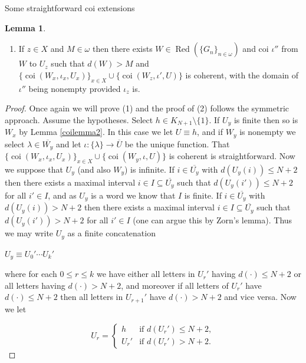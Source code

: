 \documentclass{amsart}
\theoremstyle{definition}\newtheorem{theorem}{Theorem}
\theoremstyle{definition}\newtheorem*{A}{Main Theorem}
\theoremstyle{definition}\newtheorem*{B}{Theorem \ref{elementaryequiv}}
\theoremstyle{definition}\newtheorem*{C}{Theorem \ref{continuous}}
\theoremstyle{definition}\newtheorem*{D}{Theorem \ref{bigisomorphism2}}
\theoremstyle{definition}\newtheorem{bigtheorem}{Main Theorem}
\numberwithin{theorem}{section}
\theoremstyle{definition}\newtheorem{corollary}[theorem]{Corollary}
\theoremstyle{definition}\newtheorem{proposition}[theorem]{Proposition}
\theoremstyle{definition}\newtheorem{definition}[theorem]{Definition}
\theoremstyle{definition}\newtheorem{question}[theorem]{Question}
\theoremstyle{definition}\newtheorem{example}[theorem]{Example}
\theoremstyle{definition}\newtheorem{remark}[theorem]{Remark}
\theoremstyle{definition}\newtheorem{note}[theorem]{Note}
\theoremstyle{definition}\newtheorem{lemma}[theorem]{Lemma}
\theoremstyle{definition}\newtheorem{fact}[theorem]{Fact}
\theoremstyle{definition}\newtheorem{define}[theorem]{Definition}
\theoremstyle{definition}\newtheorem{claim}[theorem]{Claim}
\theoremstyle{definition}\newtheorem{obs}[theorem]{Observation}
\theoremstyle{definition}\newtheorem{definitions}[theorem]{Definitions}
\newcommand{\Red}{\operatorname{Red}}
\newcommand{\coi}{\operatorname{coi}}
\begin{document}
\begin{section}{Some straightforward coi extensions}
\begin{lemma}
\begin{enumerate}
\item If $z \in X$ and $M \in \omega$ then there exists $W \in \Red(\{G_n\}_{n \in \omega})$ and coi $\iota''$ from $W$ to $U_z$ such that $d(W) > M$ and $\{\coi(W_x, \iota_x, U_x)\}_{x\in X} \cup \{\coi(W_z, \iota', U)\}$ is coherent, with the domain of $\iota''$ being nonempty provided $\iota_z$ is.  

\end{enumerate}
\end{lemma}


\begin{proof}  Once again we will prove (1) and the proof of (2) follows the symmetric approach.  Assume the hypotheses.  Select $h \in K_{N+1} \setminus \{1\}$.  If $U_y$ is finite then so is $W_x$ by Lemma \ref{coilemma2}.  In this case we let $U \equiv h$, and if $W_y$ is nonempty we select $\lambda \in \overline{W_y}$ and let $\iota: \{\lambda\} \rightarrow \overline{U}$ be the unique function.  That $\{\coi(W_x, \iota_x, U_x)\}_{x\in X} \cup \{\coi(W_y, \iota, U)\}$ is coherent is straightforward.  Now we suppose that $U_y$ (and also $W_y$) is infinite.  If $i \in \overline{U_y}$ with $d(U_y(i)) \leq N + 2$ then there exists a maximal interval $i \in  I \subseteq \overline{U_y}$ such that $d(U_y(i')) \leq N+2$ for all $i' \in I$, and as $U_y$ is a word we know that $I$ is finite.  If $i \in \overline{U_y}$ with $d(U_y(i)) > N + 2$ then there exists a maximal interval $i \in I \subseteq \overline{U_y}$ such that $d(U_y(i')) > N + 2$ for all $i' \in I$ (one can argue this by Zorn's lemma).  Thus we may write $U_y$ as a finite concatenation

\begin{center}

$U_y \equiv U_0' \cdots U_k'$

\end{center}

\noindent where for each $0 \leq r \leq k$ we have either all letters in $U_r'$ having $d(\cdot) \leq N + 2$ or all letters having $d(\cdot) > N + 2$, and moreover if all letters of $U_r'$ have $d(\cdot) \leq N + 2$ then all letters in $U_{r + 1}'$ have $d(\cdot) > N + 2$ and vice versa.  Now we let

\[
U_r = \left\{
\begin{array}{ll}
h
                                            & \text{if } d(U_r') \leq N+2, \\
U_r'                                        & \text{if }d(U_r') > N + 2.
\end{array}
\right.
\]


\end{proof}
\end{section}
\end{document}
